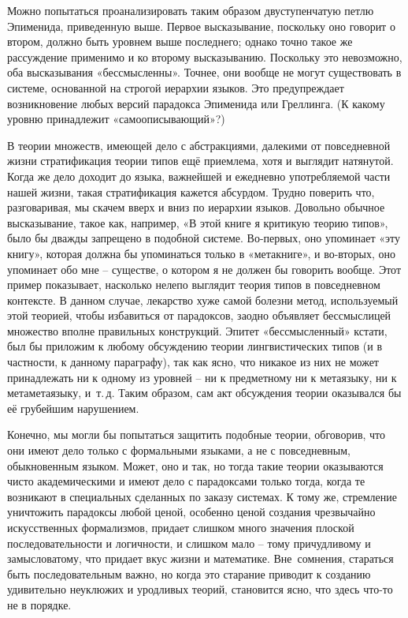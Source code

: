 \documentclass[../main.tex]{subfiles}
\begin{document}
Можно попытаться проанализировать таким образом двуступенчатую петлю Эпименида, приведенную выше. Первое высказывание, поскольку оно говорит о втором, должно быть уровнем выше последнего; однако точно такое же рассуждение применимо и ко второму высказыванию. Поскольку это невозможно, оба высказывания «бессмысленны». Точнее, они вообще не могут существовать в системе, основанной на строгой иерархии языков. Это предупреждает возникновение любых версий парадокса Эпименида или Греллинга. (К какому уровню принадлежит «самоописывающий»?)

В теории множеств, имеющей дело с абстракциями, далекими от повседневной жизни стратификация теории типов ещё приемлема, хотя и выглядит натянутой. Когда же дело доходит до языка, важнейшей и ежедневно употребляемой части нашей жизни, такая стратификация кажется абсурдом. Трудно поверить что, разговаривая, мы скачем вверх и вниз по иерархии языков. Довольно обычное высказывание, такое как, например, «В этой книге я критикую теорию типов», было бы дважды запрещено в подобной системе. Во-первых, оно упоминает «эту книгу», которая должна бы упоминаться только в «метакниге», и во-вторых, оно упоминает обо мне \--- существе, о котором я не должен бы говорить вообще. Этот пример показывает, насколько нелепо выглядит теория типов в повседневном контексте. В данном случае, лекарство хуже самой болезни метод, используемый этой теорией, чтобы избавиться от парадоксов, заодно объявляет бессмыслицей множество вполне правильных конструкций. Эпитет «бессмысленный» кстати, был бы приложим к любому обсуждению теории лингвистических типов (и в частности, к данному параграфу), так как ясно, что никакое из них не может принадлежать ни к одному из уровней \--- ни к предметному ни к метаязыку, ни к метаметаязыку, и~т.\,д. Таким образом, сам акт обсуждения теории оказывался бы её грубейшим нарушением.

Конечно, мы могли бы попытаться защитить подобные теории, обговорив, что они имеют дело только с формальными языками, а не с повседневным, обыкновенным языком. Может, оно и так, но тогда такие теории оказываются чисто академическими и имеют дело с парадоксами только тогда, когда те возникают в специальных сделанных по заказу системах. К тому же, стремление уничтожить парадоксы любой ценой, особенно ценой создания чрезвычайно искусственных формализмов, придает слишком много значения плоской последовательности и логичности, и слишком мало \--- тому причудливому и замысловатому, что придает вкус жизни и математике. Вне~сомнения, стараться быть последовательным важно, но когда это старание приводит к созданию удивительно неуклюжих и уродливых теорий, становится ясно, что здесь что-то не в порядке.
\end{document}
